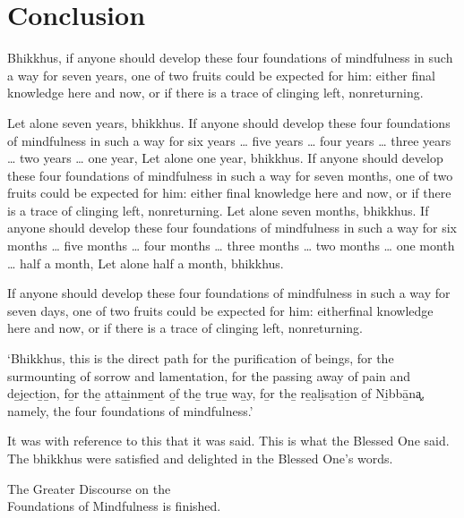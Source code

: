 

\englishPage
\chapter{Conclusion}

Bhikkhus, if anyone should develop these four foundations of mindfulness in
such a way for seven years, one of two fruits could be expected for him: either
final knowledge here and now, or if there is a trace of clinging left,
nonreturning.

Let alone seven years, bhikkhus. If anyone should develop these four
foundations of mindfulness in such a way for six years \ldots{} five years
\ldots{} four years \ldots{} three years \ldots{} two years \ldots{} one year,
Let alone one year, bhikkhus. If anyone should develop these four foundations
of mindfulness in such a way for seven months, one of two fruits could be
expected for him: either final knowledge here and now, or if there is a trace of
clinging left, nonreturning. Let alone seven months, bhikkhus. If anyone should
develop these four foundations of mindfulness in such a way for six months
\ldots{} five months \ldots{} four months \ldots{} three months \ldots{} two
months \ldots{} one month \ldots{} half a month, Let alone half a month,
bhikkhus.

If anyone should develop these four foundations of mindfulness in such a way
for seven days, one of two fruits could be expected for him: eitherfinal
knowledge here and now, or if there is a trace of clinging left, nonreturning.

`Bhikkhus, this is the direct path for the purification of beings, for the
surmounting of sorrow and lamentation, for the passing away of pain and
de̱je̱cti̱o̱n, fo̱r the̱ a̱tta̱i̱nme̱nt o̱f the̱ tru̱e̱ wa̱y, fo̱r the̱ re̱a̮li̮sa̮ti̱o̱n o̱f Ni̱bbā̱na͓,
namely, the four foundations of mindfulness.'

It was with reference to this that it was said. This is what the Blessed One
said. The bhikkhus were satisfied and delighted in the Blessed One's words.

\bigskip

{\centering\instructionFont\color{instruction}\upshape

  The Greater Discourse on the\\
  Foundations of Mindfulness is finished.

}

